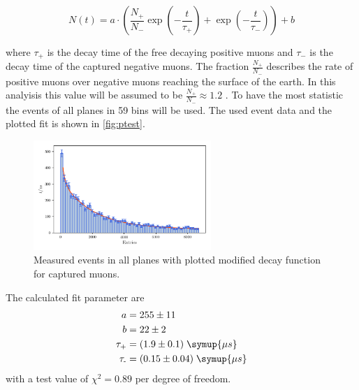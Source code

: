 \begin{equation*}
    N(t) = a \cdot \left( \frac{N_{+}}{N_{-}}\exp\left(- \frac{t}{\tau_{+}}\right) + \exp\left(- \frac{t}{\tau_{-}}\right) \right)  + b 
\end{equation*}

where $\tau_{+}$ is the decay time of the free decaying positive muons and $\tau_{-}$ is the decay time 
of the captured negative muons. The fraction $\frac{N_{+}}{N_{-}}$ describes the rate of 
positive muons over negative muons reaching the surface of the earth. In this analyisis this 
value will be assumed to be $\frac{N_{+}}{N_{-}} \approx 1.2$ \cite{lvd}. To have 
the most statistic the events of all planes in 59 bins will be used. The used event data and 
the plotted fit is shown in \autoref{fig:ptest}.

\begin{figure}
	 \centering
	 \includegraphics[width=0.6\textwidth]{plots/ptest.pdf}
	 \caption{Measured events in all planes with plotted modified decay function for captured muons.}
	 \label{fig:ptest}
\end{figure}
	
The calculated fit parameter are
	\begin{align*}
	 a &= 255 \pm 11\\
	 b &= 22 \pm 2 \\
	 \tau_{\text{+}} &= (1.9 \pm 0.1) \; \symup{\mu s}\\
	 \tau_{\text{-}} &= (0.15 \pm 0.04) \; \symup{\mu s}
	\end{align*}
with a test value of $\chi^2 = 0.89$ per degree of freedom.
